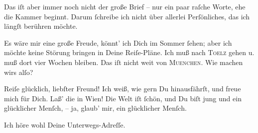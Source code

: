 \pstart
           {\pb}Das iſt aber immer noch nicht der große Brief – nur
               ein paar raſche Worte, ehe die Kammer beginnt. Darum{ }ſchreibe
               ich nicht über allerlei Perſönliches, das ich längſt berühren möchte.\pend
           
\pstart
           Es wäre mir eine große Freude, könnt’ ich Dich im Sommer{ }ſehen; aber ich möchte keine
                  {\pb}Störung bringen in Deine Reiſe-Pläne. \strikeout{\textcolor{gray}{×}} Ich muß nach \textsc{Toelz} gehen u. muß dort vier Wochen bleiben. Das iſt nicht weit von \textsc{Muenchen}. Wie machen wirs alſo?\pend
           
\pstart
           Reiſe glücklich, liebſter Freund! Ich weiß, wie gern Du hinausfährſt, und freue mich
               für Dich. Laß’ die \label{K_L02737-5v}\label{K_L02737-5} in Wien! Die Welt iſt{ }ſchön, und Du biſt jung und ein glücklicher
               Menſch, – ja, glaub’ mir, ein glücklicher Menſch.\pend
           
\pstart
           Ich höre wohl Deine Unterwegs-Adreſſe.\pend
           
